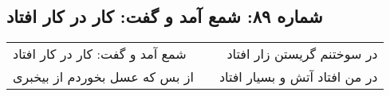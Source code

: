 \begin{center}
\section*{شماره ۸۹: شمع آمد و گفت: کار در کار افتاد}
\label{sec:089}
\begin{longtable}{l p{0.5cm} r}
شمع آمد و گفت: کار در کار افتاد
&&
در سوختنم گریستن زار افتاد
\\
از بس که عسل بخوردم از بیخبری
&&
در من افتاد آتش و بسیار افتاد
\\
\end{longtable}
\end{center}
